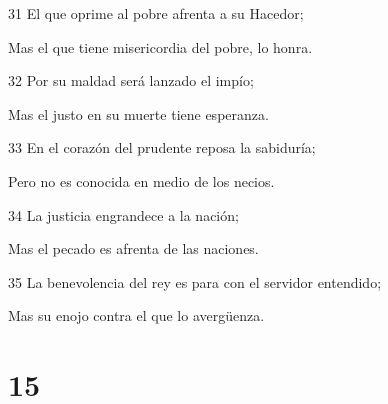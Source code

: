 \par 31 El que oprime al pobre afrenta a su Hacedor;
\par Mas el que tiene misericordia del pobre, lo honra.
\par 32 Por su maldad será lanzado el impío;
\par Mas el justo en su muerte tiene esperanza.
\par 33 En el corazón del prudente reposa la sabiduría;
\par Pero no es conocida en medio de los necios.
\par 34 La justicia engrandece a la nación;
\par Mas el pecado es afrenta de las naciones.
\par 35 La benevolencia del rey es para con el servidor entendido;
\par Mas su enojo contra el que lo avergüenza.

\chapter{15}

